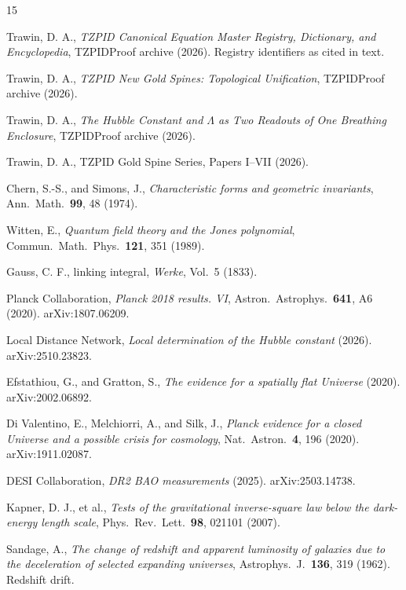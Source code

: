 \documentclass[11pt]{article}
\theoremstyle{remark}
\begin{document}
\begin{thebibliography}{15}

 Trawin, D. A., \emph{TZPID Canonical Equation Master Registry, Dictionary, and Encyclopedia}, TZPIDProof archive (2026). Registry identifiers as cited in text.

 Trawin, D. A., \emph{TZPID New Gold Spines: Topological Unification}, TZPIDProof archive (2026).

 Trawin, D. A., \emph{The Hubble Constant and $\Lambda$ as Two Readouts of One Breathing Enclosure}, TZPIDProof archive (2026).

 Trawin, D. A., TZPID Gold Spine Series, Papers I--VII (2026).

 Chern, S.-S., and Simons, J., \emph{Characteristic forms and geometric invariants}, Ann.\ Math.\ \textbf{99}, 48 (1974).

 Witten, E., \emph{Quantum field theory and the Jones polynomial}, Commun.\ Math.\ Phys.\ \textbf{121}, 351 (1989).

 Gauss, C. F., linking integral, \emph{Werke}, Vol.\ 5 (1833).

 Planck Collaboration, \emph{Planck 2018 results. VI}, Astron.\ Astrophys.\ \textbf{641}, A6 (2020). arXiv:1807.06209.

 Local Distance Network, \emph{Local determination of the Hubble constant} (2026). arXiv:2510.23823.

 Efstathiou, G., and Gratton, S., \emph{The evidence for a spatially flat Universe} (2020). arXiv:2002.06892.

 Di Valentino, E., Melchiorri, A., and Silk, J., \emph{Planck evidence for a closed Universe and a possible crisis for cosmology}, Nat.\ Astron.\ \textbf{4}, 196 (2020). arXiv:1911.02087.

 DESI Collaboration, \emph{DR2 BAO measurements} (2025). arXiv:2503.14738.

 Kapner, D. J., et al., \emph{Tests of the gravitational inverse-square law below the dark-energy length scale}, Phys.\ Rev.\ Lett.\ \textbf{98}, 021101 (2007).

 Sandage, A., \emph{The change of redshift and apparent luminosity of galaxies due to the deceleration of selected expanding universes}, Astrophys.\ J.\ \textbf{136}, 319 (1962). Redshift drift.

\end{thebibliography}
\end{document}
